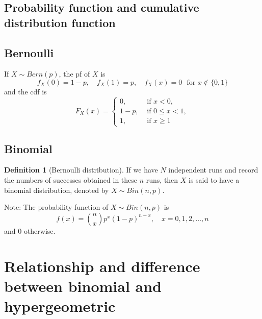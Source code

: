 \documentclass[
]{book}
\theoremstyle{definition}
\newtheorem{definition}{Definition}[chapter]
\theoremstyle{definition}
\theoremstyle{definition}
\theoremstyle{definition}
\theoremstyle{remark}
\begin{document}
\hypertarget{probability-function-and-cumulative-distribution-function}{%
\subsection{Probability function and cumulative distribution function}\label{probability-function-and-cumulative-distribution-function}}

\hypertarget{bernoulli}{%
\subsection{Bernoulli}\label{bernoulli}}

If \(X\sim Bern(p)\), the pf of \(X\) is
\[ f_X(0)=1-p,\quad f_X(1)=p,\quad f_X(x)=0\,\,\text{ for }x\not\in\{0,1\}\]
and the cdf is
\[ F_X(x)=\begin{cases} 0, &\text{ if }x<0, \\ 1-p, &\text{ if } 0\leq x < 1,\\ 1, &\text{ if }x\geq 1\end{cases}\]

\hypertarget{binomial}{%
\subsection{Binomial}\label{binomial}}

\begin{definition}[Bernoulli distribution]
If we have \(N\) independent runs and record the numbers of successes obtained in these \(n\) runs, then \(X\) is said to have a binomial distribution, denoted by \(X\sim Bin(n,p)\).
\end{definition}

Note: The probability function of \(X\sim Bin(n, p)\) is
\[ f(x) = \binom{n}{x} p^x(1-p)^{n-x},\quad x=0,1,2,\dots,n\]
and 0 otherwise.

\hypertarget{relationship-and-difference-between-binomial-and-hypergeometric}{%
\section{Relationship and difference between binomial and hypergeometric}\label{relationship-and-difference-between-binomial-and-hypergeometric}}
\end{document}
